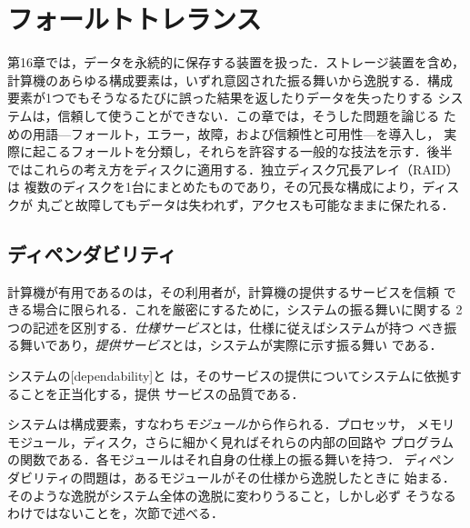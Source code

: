 \documentclass[../main.tex]{subfiles}
\begin{document}
\chapter{フォールトトレランス}

第16章では，データを永続的に保存する装置を扱った．ストレージ装置を含め，
計算機のあらゆる構成要素は，いずれ意図された振る舞いから逸脱する．構成
要素が1つでもそうなるたびに誤った結果を返したりデータを失ったりする
システムは，信頼して使うことができない．この章では，そうした問題を論じる
ための用語---フォールト，エラー，故障，および信頼性と可用性---を導入し，
実際に起こるフォールトを分類し，それらを許容する一般的な技法を示す．後半
ではこれらの考え方をディスクに適用する．独立ディスク冗長アレイ（RAID）は
複数のディスクを1台にまとめたものであり，その冗長な構成により，ディスクが
丸ごと故障してもデータは失われず，アクセスも可能なままに保たれる．

\section{ディペンダビリティ}
\label{sec:l17-dependability}

計算機が有用であるのは，その利用者が，計算機の提供するサービスを信頼
できる場合に限られる．これを厳密にするために，システムの振る舞いに関する
2つの記述を区別する．\emph{仕様サービス}とは，仕様に従えばシステムが持つ
べき振る舞いであり，\emph{提供サービス}とは，システムが実際に示す振る舞い
である．

\begin{definition}[ディペンダビリティ]
  システムの[dependability]と
  は，そのサービスの提供についてシステムに依拠することを正当化する，提供
  サービスの品質である．
\end{definition}

システムは構成要素，すなわち\emph{モジュール}から作られる．プロセッサ，
メモリモジュール，ディスク，さらに細かく見ればそれらの内部の回路や
プログラムの関数である．各モジュールはそれ自身の仕様上の振る舞いを持つ．
ディペンダビリティの問題は，あるモジュールがその仕様から逸脱したときに
始まる．そのような逸脱がシステム全体の逸脱に変わりうること，しかし必ず
そうなるわけではないことを，次節で述べる．
\end{document}
